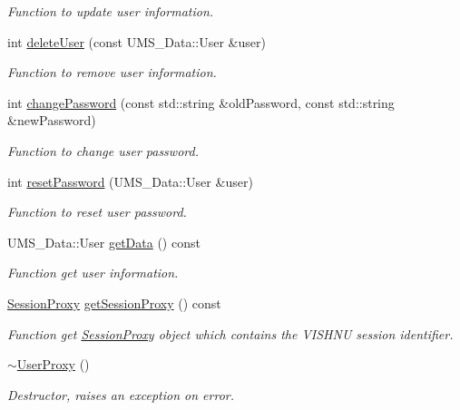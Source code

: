 \begin{DoxyCompactItemize}
\begin{DoxyCompactList}\small\item\em Function to update user information. \item\end{DoxyCompactList}\item 
int \hyperlink{classUserProxy_a61f3a85440dec730275d541ea0c05213}{deleteUser} (const UMS\_\-Data::User \&user)
\begin{DoxyCompactList}\small\item\em Function to remove user information. \item\end{DoxyCompactList}\item 
int \hyperlink{classUserProxy_a6dae7cef256b94bcfc3ae42ea8825ea3}{changePassword} (const std::string \&oldPassword, const std::string \&newPassword)
\begin{DoxyCompactList}\small\item\em Function to change user password. \item\end{DoxyCompactList}\item 
int \hyperlink{classUserProxy_ab4870acd027834b353633407779f7aa1}{resetPassword} (UMS\_\-Data::User \&user)
\begin{DoxyCompactList}\small\item\em Function to reset user password. \item\end{DoxyCompactList}\item 
UMS\_\-Data::User \hyperlink{classUserProxy_a0a3a6f78441bee53d39c3d50d3ba2ddb}{getData} () const 
\begin{DoxyCompactList}\small\item\em Function get user information. \item\end{DoxyCompactList}\item 
\hyperlink{classSessionProxy}{SessionProxy} \hyperlink{classUserProxy_aa09ec45cdaace5865b0b8bc012348caa}{getSessionProxy} () const 
\begin{DoxyCompactList}\small\item\em Function get \hyperlink{classSessionProxy}{SessionProxy} object which contains the VISHNU session identifier. \item\end{DoxyCompactList}\item 
\hypertarget{classUserProxy_ac88d4f0e6ae544cffe917eae8be7cbba}{
\hyperlink{classUserProxy_ac88d4f0e6ae544cffe917eae8be7cbba}{$\sim$UserProxy} ()}
\label{classUserProxy_ac88d4f0e6ae544cffe917eae8be7cbba}

\begin{DoxyCompactList}\small\item\em Destructor, raises an exception on error. \item\end{DoxyCompactList}\end{DoxyCompactItemize}
